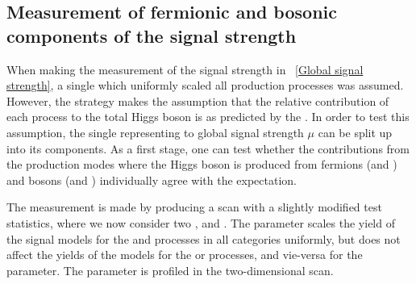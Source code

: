\subsection{Measurement of fermionic and bosonic components of the signal strength}
\label{sec:statandresults:rvrf}

When making the measurement of the signal strength in \Sec~\ref{Global signal strength}, a single \POI which uniformly scaled all production processes was assumed. However, the strategy makes the assumption that the relative contribution of each process to the total Higgs boson \crosssection is as predicted by the \SM. In order to test this assumption, the single \POI representing to global signal strength $\mu$ can be split up into its components. As a first stage, one can test whether the contributions from the production modes where the Higgs boson is produced from fermions (\ggH and \ttH) and bosons (\VBF and \VH) individually agree with the \SM expectation.

The measurement is made by producing a \DNLL scan with a slightly modified test statistics, where we now consider two \POI\s, \muF and \muV. The \muF parameter scales the yield of the signal models for the \ggH and \ttH processes in all categories uniformly, but does not affect the yields of the models for the \VBF or \VH processes, and vie-versa for the \muV parameter. The \mH parameter is profiled in the two-dimensional \DNLL scan.

